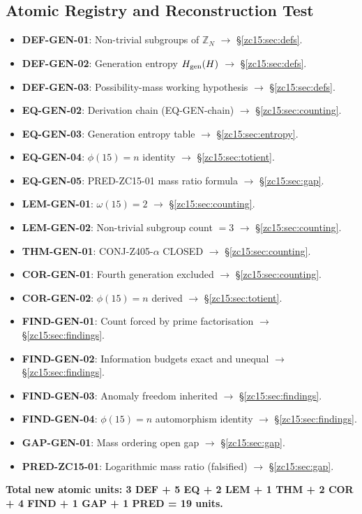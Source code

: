\documentclass[12pt, a4paper]{article}
\begin{document}
\subsection{Atomic Registry and Reconstruction Test}
\label{zc15:sec:registry}

\begin{formalbox}[title={Atomic units introduced by TASK-ZC15
  (13 new units)}]
\begin{itemize}[leftmargin=*]
  \item \textbf{DEF-GEN-01}: Non-trivial subgroups of $\mathbb{Z}_N$
    $\to$ \S\ref{zc15:sec:defs}.
  \item \textbf{DEF-GEN-02}: Generation entropy $H_{\rm gen}(H)$
    $\to$ \S\ref{zc15:sec:defs}.
  \item \textbf{DEF-GEN-03}: Possibility-mass working hypothesis
    $\to$ \S\ref{zc15:sec:defs}.
  \item \textbf{EQ-GEN-02}: Derivation chain (EQ-GEN-chain)
    $\to$ \S\ref{zc15:sec:counting}.
  \item \textbf{EQ-GEN-03}: Generation entropy table
    $\to$ \S\ref{zc15:sec:entropy}.
  \item \textbf{EQ-GEN-04}: $\phi(15)=n$ identity
    $\to$ \S\ref{zc15:sec:totient}.
  \item \textbf{EQ-GEN-05}: PRED-ZC15-01 mass ratio formula
    $\to$ \S\ref{zc15:sec:gap}.
  \item \textbf{LEM-GEN-01}: $\omega(15)=2$
    $\to$ \S\ref{zc15:sec:counting}.
  \item \textbf{LEM-GEN-02}: Non-trivial subgroup count $=3$
    $\to$ \S\ref{zc15:sec:counting}.
  \item \textbf{THM-GEN-01}: CONJ-Z405-$\alpha$ CLOSED
    $\to$ \S\ref{zc15:sec:counting}.
  \item \textbf{COR-GEN-01}: Fourth generation excluded
    $\to$ \S\ref{zc15:sec:counting}.
  \item \textbf{COR-GEN-02}: $\phi(15)=n$ derived
    $\to$ \S\ref{zc15:sec:totient}.
  \item \textbf{FIND-GEN-01}: Count forced by prime factorisation
    $\to$ \S\ref{zc15:sec:findings}.
  \item \textbf{FIND-GEN-02}: Information budgets exact and unequal
    $\to$ \S\ref{zc15:sec:findings}.
  \item \textbf{FIND-GEN-03}: Anomaly freedom inherited
    $\to$ \S\ref{zc15:sec:findings}.
  \item \textbf{FIND-GEN-04}: $\phi(15)=n$ automorphism identity
    $\to$ \S\ref{zc15:sec:findings}.
  \item \textbf{GAP-GEN-01}: Mass ordering open gap
    $\to$ \S\ref{zc15:sec:gap}.
  \item \textbf{PRED-ZC15-01}: Logarithmic mass ratio (falsified)
    $\to$ \S\ref{zc15:sec:gap}.
\end{itemize}
\textbf{Total new atomic units: 3 DEF + 5 EQ + 2 LEM + 1 THM +
2 COR + 4 FIND + 1 GAP + 1 PRED = 19 units.}
\end{formalbox}
\end{document}
